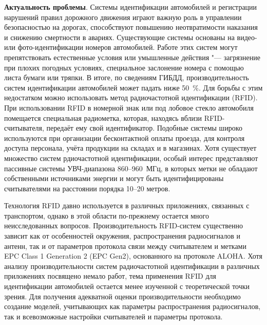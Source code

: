 \textbf{Актуальность проблемы}. Системы идентификации автомобилей и регистрации нарушений правил дорожного движения играют важную роль в управлении безопасностью на дорогах, способствуют повышению неотвратимости наказания и снижению смертности в авариях. Существующие системы основаны на видео- или фото-идентификации номеров автомобилей. Работе этих систем могут препятствовать естественные условия или умышленные действия "--- загрязнение при плохих погодных условиях, специальное заслонение номера с помощью листа бумаги или тряпки. В итоге, по сведениям ГИБДД, производительность систем идентификации автомобилей может падать ниже 50~\%. Для борьбы с этим недостатком можно использовать метод радиочастотной идентификации (RFID). При использовании RFID в номерной знак или под лобовое стекло автомобиля помещается специальная радиометка, которая, находясь вблизи RFID-считывателя, передаёт ему свой идентификатор. Подобные системы широко используются при организации бесконтактной оплаты проезда, для контроля доступа персонала, учёта продукции на складах и в магазинах. Хотя существует множество систем рдиочастотной идентификации, особый интерес представляют пассивные системы УВЧ-диапазона 860--960~МГц, в которых метки не обладают собственными источниками энергии и могут быть идентифицированы считывателями на расстоянии порядка 10--20 метров.

Технология RFID давно используется в различных приложениях, связанных с транспортом, однако в этой области по-прежнему остается много неисследованных вопросов. Производительность RFID-систем существенно зависит как от особенностей окружения, распространения радиосигналов и антенн, так и от параметров протокола связи между считывателем и метками EPC Class 1 Generation 2 (EPC Gen2), основанного на протоколе ALOHA. Хотя анализу производительности систем радиочастотной идентификации в различных приложениях посвящено немало работ, тема применения RFID для идентификации автомобилей остается менее изученной с теоретической точки зрения. Для получения адекватной оценки производительности необходимо создание моделей, учитывающих как параметры распространения радиосигналов, так и всевозможные настройки считывателей и параметры протокола.

